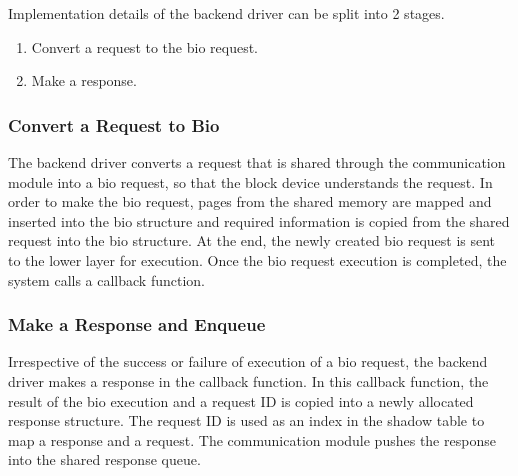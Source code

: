 Implementation details of the backend driver can be split into 2 stages. 
\begin{enumerate}
\item Convert a request to the bio request. 
\item Make a response.
\end{enumerate}

\subsubsection*{Convert a Request to Bio}
\label{subsec:createbio}
The backend driver converts a request that is shared through the
communication module into a bio request, so that the block device
understands the request. In order to make the bio request, pages from
the shared memory are mapped and inserted into the bio structure and
required information is copied from the shared request into the bio
structure. At the end, the newly created bio request is sent to the
lower layer for execution. Once the bio request execution is completed,
the system calls a callback function.

\subsubsection*{Make a Response and Enqueue}
Irrespective of the success or failure of execution of a bio request,
the backend driver makes a response in the callback function. In this
callback function, the result of the bio execution and a request ID is
copied into a newly allocated response structure. The request ID is used
as an index in the shadow table to map a response and a request. The
communication module pushes the response into the shared response queue.

